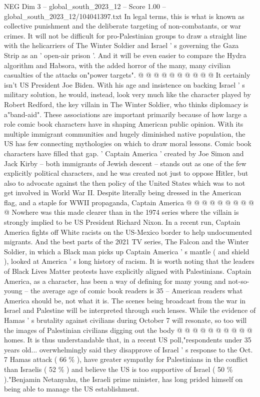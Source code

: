 \begin{textsample}{NEG Dim 3 – global\_south\_2023\_12 – Score 1.00 – global\_south\_2023\_12/104041397.txt}
In legal terms, this is what is known as collective punishment and the deliberate targeting of non-combatants, or war crimes.
It will not be difficult for pro-Palestinian groups to draw a straight line with the helicarriers of The Winter Soldier and Israel ' s governing the Gaza Strip as an ' open-air prison '.
And it will be even easier to compare the Hydra algorithm and Habsora, with the added horror of the many, many civilian casualties of the attacks on"power targets". @ @ @ @ @ @ @ @ @ @ It certainly isn't US President Joe Biden.
With his age and insistence on backing Israel ' s military solution, he would, instead, look very much like the character played by Robert Redford, the key villain in The Winter Soldier, who thinks diplomacy is a"band-aid".
These associations are important primarily because of how large a role comic book characters have in shaping American public opinion.
With its multiple immigrant communities and hugely diminished native population, the US has few connecting mythologies on which to draw moral lessons.
Comic book characters have filled that gap. ' Captain America ' created by Joe Simon and Jack Kirby -- both immigrants of Jewish descent -- stands out as one of the few explicitly political characters, and he was created not just to oppose Hitler, but also to advocate against the then policy of the United States which was to not get involved in World War II.
Despite literally being dressed in the American flag, and a staple for WWII propaganda, Captain America @ @ @ @ @ @ @ @ @ @ Nowhere was this made clearer than in the 1974 series where the villain is strongly implied to be US President Richard Nixon.
In a recent run, Captain America fights off White racists on the US-Mexico border to help undocumented migrants.
And the best parts of the 2021 TV series, The Falcon and the Winter Soldier, in which a Black man picks up Captain America ' s mantle ( and shield ), looked at America ' s long history of racism.
It is worth noting that the leaders of Black Lives Matter protests have explicitly aligned with Palestinians.
Captain America, as a character, has been a way of defining for many young and not-so-young -- the average age of comic book readers is 35 -- American readers what America should be, not what it is.
The scenes being broadcast from the war in Israel and Palestine will be interpreted through such lenses.
While the evidence of Hamas ' s brutality against civilians during October 7 will resonate, so too will the images of Palestinian civilians digging out the body @ @ @ @ @ @ @ @ @ @ homes.
It is thus understandable that, in a recent US poll,"respondents under 35 years old... overwhelmingly said they disapprove of Israel ' s response to the Oct. 7 Hamas attack ( 66 \% ), have greater sympathy for Palestinians in the conflict than Israelis ( 52 \% ) and believe the US is too supportive of Israel ( 50 \% )."Benjamin Netanyahu, the Israeli prime minister, has long prided himself on being able to manage the US establishment.

\end{textsample}
